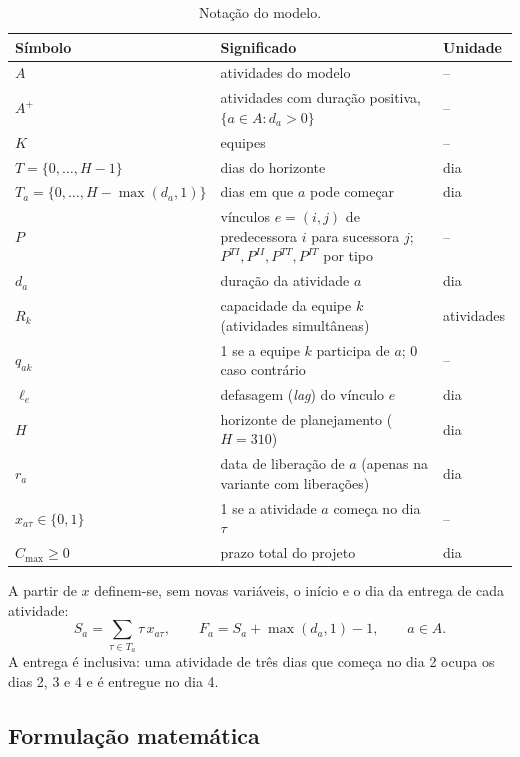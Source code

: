 \begin{table}[htbp]
  \centering
  \caption{Notação do modelo.}
  \label{tab:notacao}
  \small
  \begin{tabularx}{\textwidth}{lXl}
    \toprule
    Símbolo & Significado & Unidade \\
    \midrule
    $A$ & atividades do modelo & -- \\
    $A^{+}$ & atividades com duração positiva, $\{a\in A : d_a>0\}$ & -- \\
    $K$ & equipes & -- \\
    $T=\{0,\ldots,H-1\}$ & dias do horizonte & dia \\
    $T_a=\{0,\ldots,H-\max(d_a,1)\}$ & dias em que $a$ pode começar & dia \\
    $P$ & vínculos $e=(i,j)$ de predecessora $i$ para sucessora $j$;
          $P^{TI},P^{II},P^{TT},P^{IT}$ por tipo & -- \\
    \midrule
    $d_a$ & duração da atividade $a$ & dia \\
    $R_k$ & capacidade da equipe $k$ (atividades simultâneas) & atividades \\
    $q_{ak}$ & 1 se a equipe $k$ participa de $a$; 0 caso contrário & -- \\
    $\ell_e$ & defasagem (\emph{lag}) do vínculo $e$ & dia \\
    $H$ & horizonte de planejamento ($H=310$) & dia \\
    $r_a$ & data de liberação de $a$ (apenas na variante com liberações) & dia \\
    \midrule
    $x_{a\tau}\in\{0,1\}$ & 1 se a atividade $a$ começa no dia $\tau$ & -- \\
    $C_{\max}\ge 0$ & prazo total do projeto & dia \\
    \bottomrule
  \end{tabularx}
\end{table}

A partir de $x$ definem-se, sem novas variáveis, o início e o dia da
entrega de cada atividade:
\begin{equation}
  S_a=\sum_{\tau\in T_a}\tau\,x_{a\tau},
  \qquad
  F_a=S_a+\max(d_a,1)-1,
  \qquad a\in A.
  \label{eq:inicio-entrega}
\end{equation}
A entrega é inclusiva: uma atividade de três dias que começa no dia 2
ocupa os dias 2, 3 e 4 e é entregue no dia 4.

\subsection{Formulação matemática}
\label{sec:formulacao}

